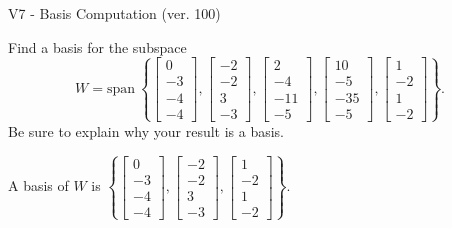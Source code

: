 \begin{exercise}
  \begin{exerciseTitle}V7 - Basis Computation (ver. 100)\end{exerciseTitle}
  \begin{exerciseStatement}
    Find a basis for the subspace 
\[W=\mathrm{span}\ \left\{\left[\begin{array}{r}
0 \\
-3 \\
-4 \\
-4
\end{array}\right] , \left[\begin{array}{r}
-2 \\
-2 \\
3 \\
-3
\end{array}\right] , \left[\begin{array}{r}
2 \\
-4 \\
-11 \\
-5
\end{array}\right] , \left[\begin{array}{r}
10 \\
-5 \\
-35 \\
-5
\end{array}\right] , \left[\begin{array}{r}
1 \\
-2 \\
1 \\
-2
\end{array}\right]\right\}.\]
 Be sure to explain why your result is a basis.


  \end{exerciseStatement}
  \begin{exerciseAnswer}
   A basis of \(W\) is  \(\left\{\left[\begin{array}{r}
0 \\
-3 \\
-4 \\
-4
\end{array}\right] , \left[\begin{array}{r}
-2 \\
-2 \\
3 \\
-3
\end{array}\right] , \left[\begin{array}{r}
1 \\
-2 \\
1 \\
-2
\end{array}\right]\right\}\).
  


  \end{exerciseAnswer}
\end{exercise}